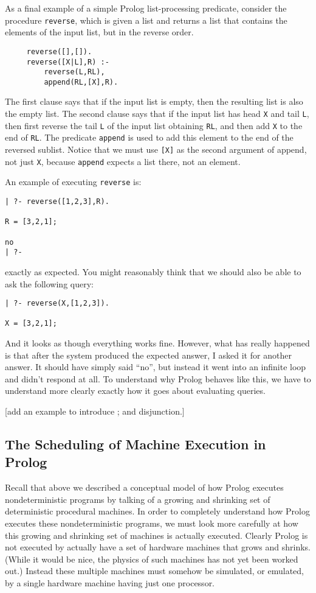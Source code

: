 As a final example of a simple Prolog list-processing predicate,
consider the procedure \verb|reverse|, which is given a list and
returns a list that contains the elements of the input list, but in
the reverse order.
\begin{verbatim}
     reverse([],[]).
     reverse([X|L],R) :-
         reverse(L,RL),
         append(RL,[X],R).
\end{verbatim}
The first clause says that if the input list is empty, then the
resulting list is also the empty list.  The second clause says that if
the input list has head \verb|X| and tail \verb|L|, then first reverse
the tail \verb|L| of the input list obtaining \verb|RL|, and then add
\verb|X| to the end of \verb|RL|.  The predicate \verb|append| is used
to add this element to the end of the reversed sublist.  Notice that
we must use \verb|[X]| as the second argument of append, not just
\verb|X|, because \verb|append| expects a list there, not an element.

An example of executing \verb|reverse| is:
\begin{verbatim}
| ?- reverse([1,2,3],R).

R = [3,2,1];

no
| ?- 
\end{verbatim}
exactly as expected.  You might reasonably think that we should also
be able to ask the following query:
\begin{verbatim}
| ?- reverse(X,[1,2,3]).

X = [3,2,1];
\end{verbatim}
And it looks as though everything works fine.  However, what has
really happened is that after the system produced the expected answer,
I asked it for another answer.  It should have simply said ``no'', but
instead it went into an infinite loop and didn't respond at all.  To
understand why Prolog behaves like this, we have to understand more
clearly exactly how it goes about evaluating queries.

[add an example to introduce ; and disjunction.]

\subsection{The Scheduling of Machine Execution in Prolog}

Recall that above we described a conceptual model of how Prolog
executes nondeterministic programs by talking of a growing and
shrinking set of deterministic procedural machines.  In order to
completely understand how Prolog executes these nondeterministic
programs, we must look more carefully at how this growing and
shrinking set of machines is actually executed.  Clearly Prolog is not
executed by actually have a set of hardware machines that grows and
shrinks.  (While it would be nice, the physics of such machines has
not yet been worked out.)  Instead these multiple machines must
somehow be simulated, or emulated, by a single hardware machine having
just one processor.

